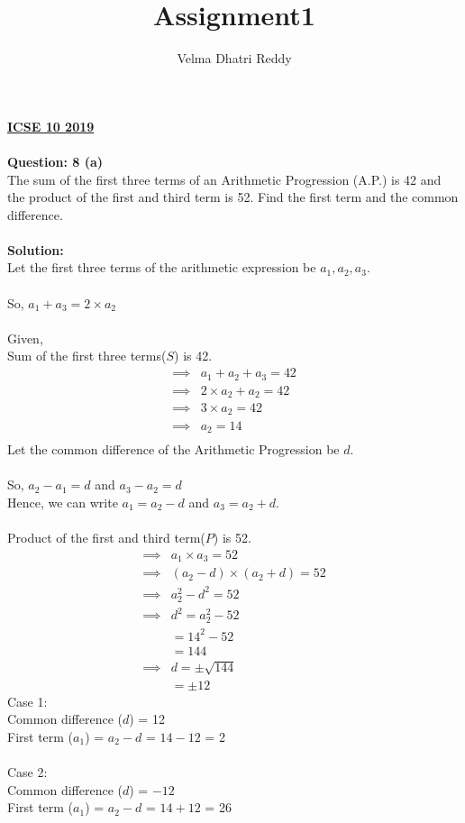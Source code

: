 \documentclass[journal,12pt,twocolumn]{IEEEtran}
\title{Assignment1}
\author{Velma Dhatri Reddy}
\begin{document}
\maketitle
\textbf{\underline{ICSE 10 2019}}\\\\
\textbf{Question: 8 (a)}\\
The sum of the first three terms of an Arithmetic Progression (A.P.) is 42 and the product of the first and third term is 52. Find the first term and the common difference.\\\\
\textbf{Solution: }\\
Let the first three terms of the arithmetic expression be $a_1, a_2, a_3$.\\\\
So, $a_1 + a_3 = 2\times a_2$\\\\
Given,\\
Sum of the first three terms($S$) is 42.
\begin{align*}
    \implies
    &a_1 + a_2 + a_3 = 42\\
    \implies
    &2 \times a_2 + a_2 = 42\\
    \implies
    & 3\times a_2 = 42\\
    \implies
    &a_2 = 14\\
\end{align*}
Let the common difference of the Arithmetic Progression be $d$.\\\\
So, $a_2 - a_1 = d$ and $a_3 - a_2 = d$\\
Hence, we can write $ a_1 = a_2 - d$ and $ a_3 = a_2 + d$.\\\\
Product of the first and third term($P$) is 52.
\begin{align*}
    \implies
    &a_1 \times a_3 = 52\\
    \implies 
    &(a_2 - d) \times (a_2 + d) = 52\\
    \implies
    &a_2^2 - d^2 = 52\\
    \implies
    &d^2 = a_2^2 - 52\\
    &= 14^2 - 52\\
    &= 144\\
    \implies
    &d = \pm \sqrt{144}\\
    &= \pm 12
\end{align*}
Case 1:\\
Common difference ($d$) = 12\\
First term ($a_1$) = $a_2 - d$ = $14 - 12$ = 2\\\\
Case 2:\\
Common difference ($d$) = $-12$\\
First term ($a_1$) = $a_2 - d$ = $14 + 12$ = 26\\
\end{document}
